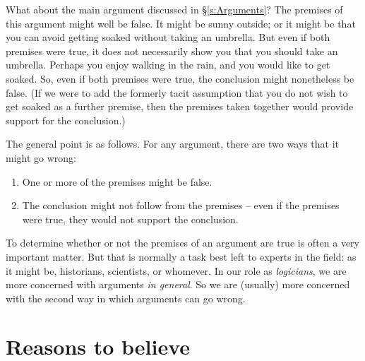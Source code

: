 What about the main argument discussed in §\ref{s:Arguments}? The premises of this argument might well be false. It might be sunny outside; or it might be that you can avoid getting soaked without taking an umbrella. But even if both premises were true, it does not necessarily show you that you should take an umbrella. Perhaps you enjoy walking in the rain, and you would like to get soaked. So, even if both premises were true, the conclusion might nonetheless be false. (If we were to add the formerly tacit assumption that you do not wish to get soaked as a further premise, then the premises taken together would provide support for the conclusion.)

%
The general point is as follows. For any argument, there are two ways that it might go wrong:
	\begin{enumerate}
		\item One or more of the premises might be false. 
		\item The conclusion might not follow from the premises – even if the premises were true, they would not support the conclusion.
	\end{enumerate}
To determine whether or not the premises of an argument are true is often a very important matter. But that is normally a task best left to experts in the field: as it might be, historians, scientists, or whomever. In our role as \emph{logicians}, we are more concerned with arguments \emph{in general}. So we are (usually) more concerned with the second way in which arguments can go wrong.


\section{Reasons to believe}

